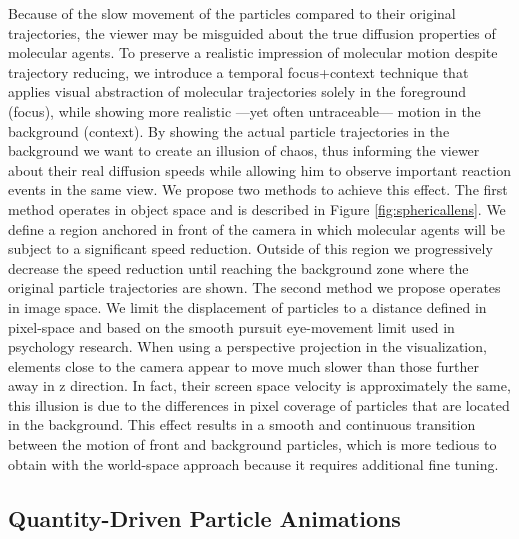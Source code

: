 Because of the slow movement of the particles compared to their original trajectories, the viewer may be misguided about the true diffusion properties of molecular agents.
To preserve a realistic impression of molecular motion despite trajectory reducing, we introduce a temporal focus+context technique that applies visual abstraction of molecular trajectories solely in the foreground (focus), while showing more realistic ---yet often untraceable--- motion in the background (context).
By showing the actual particle trajectories in the background we want to create an illusion of chaos, thus informing the viewer about their real diffusion speeds while allowing him to observe important reaction events in the same view.
We propose two methods to achieve this effect.
The first method operates in object space and is described in Figure \ref{fig:sphericallens}.
We define a region anchored in front of the camera in which molecular agents will be subject to a significant speed reduction.
Outside of this region we progressively decrease the speed reduction until reaching the background zone where the original particle trajectories are shown.
The second method we propose operates in image space.
We limit the displacement of particles to a distance defined in pixel-space and based on the smooth pursuit eye-movement limit used in psychology research.
When using a perspective projection in the visualization, elements close to the camera appear to move much slower than those further away in z direction. 
In fact, their screen space velocity is approximately the same, this illusion is due to the differences in pixel coverage of particles that are located in the background.
This effect results in a smooth and continuous transition between the motion of front and background particles, which is more tedious to obtain with the world-space approach because it requires additional fine tuning.

\subsection{Quantity-Driven Particle Animations}

